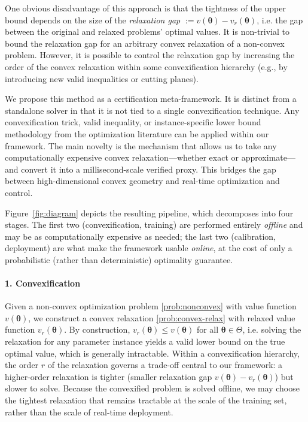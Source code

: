 \documentclass[10pt]{article} %
\theoremstyle{plain}
\theoremstyle{definition}
\theoremstyle{remark}
\begin{document}
One obvious disadvantage of this approach is that the tightness of the upper bound depends on the size of the \textit{relaxation gap} $:= v(\bm{\theta}) - v_r(\bm{\theta})$, i.e. the gap between the original and relaxed problems' optimal values. It is non-trivial to bound the relaxation gap for an arbitrary convex relaxation of a non-convex problem. However, it is possible to control the relaxation gap by increasing the order of the convex relaxation within some convexification hierarchy (e.g., by introducing new valid inequalities or cutting planes). 

We propose this method as a certification meta-framework. It is distinct from a standalone solver in that it is not tied to a single convexification technique. Any convexification trick, valid inequality, or instance-specific lower bound methodology from the optimization literature can be applied within our framework. The main novelty is the mechanism that allows us to take any computationally expensive convex relaxation---whether exact or approximate---and convert it into a millisecond-scale verified proxy. This bridges the gap between high-dimensional convex geometry and real-time optimization and control.

Figure~\ref{fig:diagram} depicts the resulting pipeline, which decomposes into four stages. The first two (convexification, training) are performed entirely \textit{offline} and may be as computationally expensive as needed; the last two (calibration, deployment) are what make the framework usable \textit{online}, at the cost of only a probabilistic (rather than deterministic) optimality guarantee.

\paragraph{1. Convexification} Given a non-convex optimization problem \cref{prob:nonconvex}{}{} with value function $v(\bm{\theta})$, we construct a convex relaxation \cref{prob:convex-relax}{}{} with relaxed value function $v_r(\bm{\theta}).$
By construction, $v_r(\bm{\theta}) \leq v(\bm{\theta})$ for all $\bm{\theta} \in \Theta$, i.e. solving the relaxation for any parameter instance yields a valid lower bound on the true optimal value, which is generally intractable.
Within a convexification hierarchy, the order $r$ of the relaxation governs a trade-off central to our framework: a higher-order relaxation is tighter (smaller relaxation gap $v(\bm{\theta}) - v_r(\bm{\theta})$) but slower to solve. Because the convexified problem is solved offline, we may choose the tightest relaxation that remains tractable at the scale of the training set, rather than the scale of real-time deployment.
\end{document}
